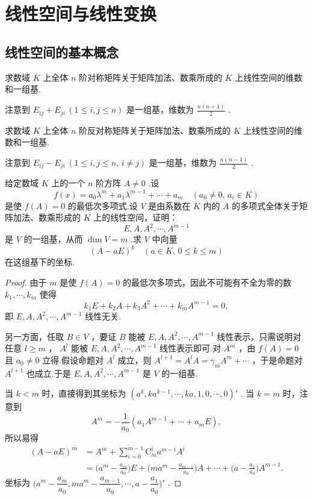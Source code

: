 \section{线性空间与线性变换}
\subsection{线性空间的基本概念}
\begin{prob}[9]
	求数域 $K$ 上全体 $n$ 阶对称矩阵关于矩阵加法、数乘所成的 $K$ 上线性空间的维数和一组基.
\end{prob}
\begin{sol}
	注意到 $E_{ij}+E_{ji}\,(1\le i,j\le n)$ 是一组基，维数为 $\frac{n(n+1)}{2}$ .
\end{sol}
\begin{prob}[10]
	求数域 $K$ 上全体 $n$ 阶反对称矩阵关于矩阵加法、数乘所成的 $K$ 上线性空间的维数和一组基.
\end{prob}
\begin{sol}
	注意到 $E_{ij}-E_{ji}\,(1\le i,j\le n,\,i\ne j)$ 是一组基，维数为 $\frac{n(n-1)}{2}$ .
\end{sol}
\begin{prob}[14]
	给定数域 $K$ 上的一个 $n$ 阶方阵 $A\ne0$ .设
	\[
		f(x)=a_0\lambda^m+a_1\lambda^{m-1}+\cdots+a_m\quad(a_0\ne0,\,a_i\in K)
	\]
	是使 $f(A)=0$ 的最低次多项式.设 $V$ 是由系数在 $K$ 内的 $A$ 的多项式全体关于矩阵加法、数乘形成的 $K$ 上的线性空间，证明：
	\[
		E,A,A^2,\cdots,A^{m-1}
	\]
	是 $V$ 的一组基，从而 $\dim V=m$ .求 $V$ 中向量
	\[
		(A-aE)^k\quad(a\in K,\,0\le k\le m)
	\]
	在这组基下的坐标.
\end{prob}
\begin{proof}
	由于 $m$ 是使 $f(A)=0$ 的最低次多项式，因此不可能有不全为零的数 $k_1,\cdots,k_m$ 使得
	\[
		k_1E+k_2A+k_3A^2+\cdots+k_mA^{m-1}=0,
	\]
	即 $E,A,A^2,\cdots,A^{m-1}$ 线性无关.

	另一方面，任取 $B\in V$ ，要证 $B$ 能被 $E,A,A^2,\cdots,A^{m-1}$ 线性表示，只需说明对任意 $l\ge m$ ， $A^l$ 能被 $E,A,A^2,\cdots,A^{m-1}$ 线性表示即可.对 $A^m$ ，由 $f(A)=0$ 且 $a_0\ne0$ 立得.假设命题对 $A^l$ 成立，则 $A^{l+1}=A^lA=\gamma_mA^m+\cdots$ ，于是命题对 $A^{l+1}$ 也成立.于是 $E,A,A^2,\cdots,A^{m-1}$ 是 $V$ 的一组基.

	当 $k<m$ 时，直接得到其坐标为 $(a^k,ka^{k-1},\cdots,ka,1,0,\cdots,0)'$ .
	当 $k=m$ 时，注意到
	\[
		A^m=-\frac{1}{a_0}(a_1A^{m-1}+\cdots+a_mE),
	\]
	所以易得
	\begin{align*}
		(A-aE)^m & =A^m+\sum_{i=0}^{m-1}\mathrm{C}_m^ia^{m-i}A^i                                                                              \\
		         & =\biggl(a^m-\frac{a_m}{a_0}\biggr)E+\biggl(ma^m-\frac{a_{m-1}}{a_0}\biggr)A+\cdots+\biggl(a-\frac{a_1}{a_0}\biggr)A^{m-1}.
	\end{align*}
	坐标为 $\biggl(a^m-\dfrac{a_m}{a_0},ma^m-\dfrac{a_{m-1}}{a_0},\cdots,a-\dfrac{a_1}{a_0}\biggr)'$ .
\end{proof}
